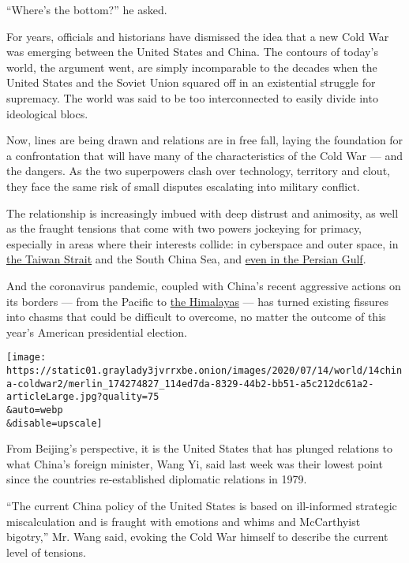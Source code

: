 ``Where's the bottom?'' he asked.

For years, officials and historians have dismissed the idea that a new
Cold War was emerging between the United States and China. The contours
of today's world, the argument went, are simply incomparable to the
decades when the United States and the Soviet Union squared off in an
existential struggle for supremacy. The world was said to be too
interconnected to easily divide into ideological blocs.

Now, lines are being drawn and relations are in free fall, laying the
foundation for a confrontation that will have many of the
characteristics of the Cold War --- and the dangers. As the two
superpowers clash over technology, territory and clout, they face the
same risk of small disputes escalating into military conflict.

The relationship is increasingly imbued with deep distrust and
animosity, as well as the fraught tensions that come with two powers
jockeying for primacy, especially in areas where their interests
collide: in cyberspace and outer space, in
\href{https://www.nytimes3xbfgragh.onion/2020/07/01/world/asia/taiwan-china-hong-kong.html}{the
Taiwan Strait} and the South China Sea, and
\href{https://www.nytimes3xbfgragh.onion/2020/07/11/world/asia/china-iran-trade-military-deal.html}{even
in the Persian Gulf}.

And the coronavirus pandemic, coupled with China's recent aggressive
actions on its borders --- from the Pacific to
\href{https://www.nytimes3xbfgragh.onion/2020/06/17/world/asia/china-india-border.html}{the
Himalayas} --- has turned existing fissures into chasms that could be
difficult to overcome, no matter the outcome of this year's American
presidential election.

\texttt{[image: https://static01.graylady3jvrrxbe.onion/images/2020/07/14/world/14china-coldwar2/merlin\_174274827\_114ed7da-8329-44b2-bb51-a5c212dc61a2-articleLarge.jpg?quality=75\\\&auto=webp\\\&disable=upscale]}

From Beijing's perspective, it is the United States that has plunged
relations to what China's foreign minister, Wang Yi, said last week was
their lowest point since the countries re-established diplomatic
relations in 1979.

``The current China policy of the United States is based on ill-informed
strategic miscalculation and is fraught with emotions and whims and
McCarthyist bigotry,'' Mr. Wang said, evoking the Cold War himself to
describe the current level of tensions.

